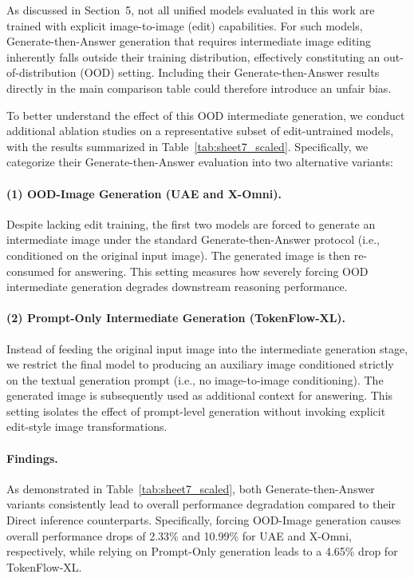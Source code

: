\documentclass{article}
\theoremstyle{plain}
\theoremstyle{definition}
\theoremstyle{remark}
\begin{document}
As discussed in Section~5, not all unified models evaluated in this work are trained with explicit image-to-image (edit) capabilities. For such models, Generate-then-Answer generation that requires intermediate image editing inherently falls outside their training distribution, effectively constituting an out-of-distribution (OOD) setting. Including their Generate-then-Answer results directly in the main comparison table could therefore introduce an unfair bias.

To better understand the effect of this OOD intermediate generation, we conduct additional ablation studies on a representative subset of edit-untrained models, with the results summarized in Table~\ref{tab:sheet7_scaled}. Specifically, we categorize their Generate-then-Answer evaluation into two alternative variants:

\paragraph{(1) OOD-Image Generation (UAE and X-Omni).}
Despite lacking edit training, the first two models are forced to generate an intermediate image under the standard Generate-then-Answer protocol (i.e., conditioned on the original input image). The generated image is then re-consumed for answering. This setting measures how severely forcing OOD intermediate generation degrades downstream reasoning performance.

\paragraph{(2) Prompt-Only Intermediate Generation (TokenFlow-XL).}
Instead of feeding the original input image into the intermediate generation stage, we restrict the final model to producing an auxiliary image conditioned strictly on the textual generation prompt (i.e., no image-to-image conditioning). The generated image is subsequently used as additional context for answering. This setting isolates the effect of prompt-level generation without invoking explicit edit-style image transformations.

\paragraph{Findings.}
As demonstrated in Table~\ref{tab:sheet7_scaled}, both Generate-then-Answer variants consistently lead to overall performance degradation compared to their Direct inference counterparts. Specifically, forcing OOD-Image generation causes overall performance drops of 2.33\% and 10.99\% for UAE and X-Omni, respectively, while relying on Prompt-Only generation leads to a 4.65\% drop for TokenFlow-XL. 
\end{document}
